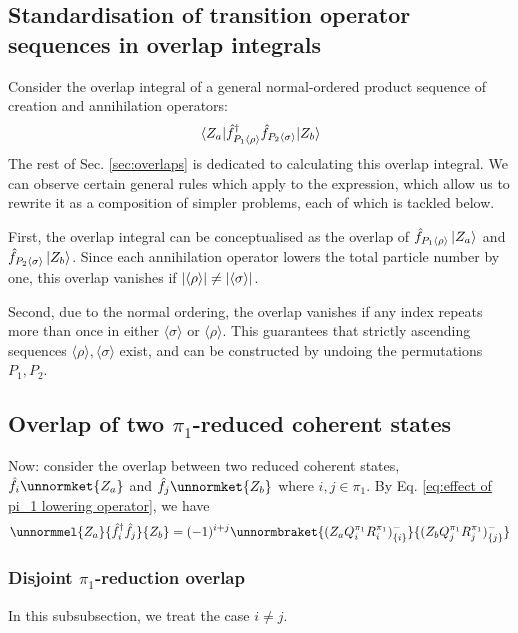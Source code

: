 \documentclass[12pt]{article}
\newcommand{\seq}[1]{\langle #1\rangle}
\newcommand{\hc}{^\dagger}
\begin{document}
	\subsection{Standardisation of transition operator sequences in overlap integrals}
	
	Consider the overlap integral of a general normal-ordered product sequence of creation and annihilation operators:
	\begin{equation}
	\mel{Z_a}{\hat{f}\hc_{P_1\seq{\rho}}\hat{f}_{P_2\seq{\sigma}}}{Z_b}
	\end{equation}
	The rest of Sec. \ref{sec:overlaps} is dedicated to calculating this overlap integral. We can observe certain general rules which apply to the expression, which allow us to rewrite it as a composition of simpler problems, each of which is tackled below.
	
	First, the overlap integral can be conceptualised as the overlap of $\hat{f}_{P_1\seq{\rho}}\ket{Z_a}$ and $\hat{f}_{P_2\seq{\sigma}}\ket{Z_b}$. Since each annihilation operator lowers the total particle number by one, this overlap vanishes if $\abs{\seq{\rho}}\neq\abs{\seq{\sigma}}$.
	
	Second, due to the normal ordering, the overlap vanishes if any index repeats more than once in either $\seq{\sigma}$ or $\seq{\rho}$. This guarantees that strictly ascending sequences $\seq{\rho},\seq{\sigma}$ exist, and can be constructed by undoing the permutations $P_1,P_2$.
	
	\subsection{Overlap of two $\pi_1$-reduced coherent states} \label{sec:pi_1 reduction overlaps}
	Now: consider the overlap between two reduced coherent states, $\hat{f}_i\unnormket{Z_a}$ and $\hat{f}_j\unnormket{Z_b}$ where $i,j\in \pi_1$. By Eq. \ref{eq:effect of pi_1 lowering operator}, we have
	\begin{equation} \label{eq: overlap of two pi_1 reduced coherent states problem}
	\unnormmel{Z_a}{\hat{f}\hc_i\hat{f}_j}{Z_b}=(-1)^{i+j}\unnormbraket{(Z_aQ^{\pi_1}_iR^{\pi_1}_i)^{-}_{\{i\}}}{(Z_bQ^{\pi_1}_jR^{\pi_1}_j)^{-}_{\{j\}}}
	\end{equation}
	
	\subsubsection{Disjoint $\pi_1$-reduction overlap} \label{sec:disjoint pi_1 reduction overlap}
	In this subsubsection, we treat the case $i\neq j$.
	
\end{document}
